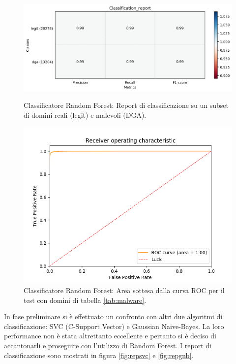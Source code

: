 \begin{figure}[htbp]
    \centering
    \includegraphics[width=.85\columnwidth]{figures/rndf_tra_nosup_nosup/class_rep.png}
    \caption{Classificatore Random Forest: Report di classificazione su un subset di domini reali (legit) e malevoli (DGA).\label{fig:repdga}}

    \centering
    \includegraphics[width=.85\columnwidth]{figures/rndf_tra_nosup_nosup/roc_plot.png}
    \caption{Classificatore Random Forest: Area sottesa dalla curva ROC per il test con domini di tabella \ref{tab:malware}.\label{fig:rocdga}}
\end{figure}

In fase preliminare si è effettuato un confronto con altri due algoritmi di classificazione: SVC (C-Support Vector) e Gaussian Naive-Bayes. La loro performance non è stata altrettanto eccellente e pertanto si è deciso di accantonarli e proseguire con l'utilizzo di Random Forest. I report di classificazione sono mostrati in figura \ref{fig:repsvc} e \ref{fig:repgnb}.


